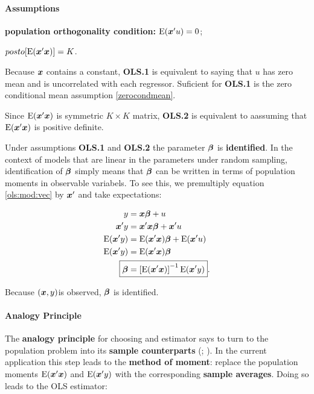 \documentclass[11pt, oneside, a4paper, article]{article}
\numberwithin{equation}{section}
\begin{document}
\paragraph{Assumptions}

\begin{description}[itemsep = 1ex]
	\item[OLS.1]  \textbf{population orthogonality condition:} $\text{E}(\boldsymbol{x}'u) = 0$;

	\item[OLS.2]  $posto[ \text{E}( \boldsymbol{x}' \boldsymbol{x} ) ] = K$.
\end{description}

Because $\boldsymbol{x}$ contains a constant, \textbf{OLS.1} is equivalent to saying that $u$ has zero mean and is uncorrelated with each regressor.
Suficient for \textbf{OLS.1} is the zero conditional mean assumption \eqref{zerocondmean}.

Since $\text{E}( \boldsymbol{x}'\boldsymbol{x} )$ is symmetric $K \times K$ matrix, \textbf{OLS.2} is equivalent to aassuming that $\text{E}( \boldsymbol{x}'\boldsymbol{x} )$ is positive definite.

Under assumptions \textbf{OLS.1} and \textbf{OLS.2} the parameter $\boldsymbol{\beta}$ is \textbf{identified}.
In the context of models that are linear in the parameters under random sampling, identification of $\boldsymbol{\beta}$ simply means that $\boldsymbol{\beta}$ can be written in terms of population moments in observable variabels.
To see this, we premultiply equation \eqref{ols:mod:vec} by $\boldsymbol{x}'$ and take expectations:

\vspace{-1 em}
\begin{align*}
	y &= \xvec \betavec + u
	\\
	\xvec' y &= \xvec' \xvec \betavec + \xvec' u
	\\
	\E( \xvec' y) &= \E( \xvec' \xvec) \betavec + \E(\xvec' u)
	\\
	\E( \xvec' y) &= \E( \xvec' \xvec) \betavec
	\\
	\Aboxed{\betavec &= \left[ \E( \xvec' \xvec) \right]^{-1} \E( \xvec' y) }.
\end{align*}

Because $(\boldsymbol{x}, y)$is observed, $\boldsymbol{\beta}$ is identified.

\paragraph{Analogy Principle}
The \textbf{analogy principle} for choosing and estimator says to turn to the population problem into its \textbf{sample counterparts} (; ).
In the current application this step leads to the \textbf{method of moment}:
replace the population moments $\text{E}( \boldsymbol{x}' \boldsymbol{x})$ and $\text{E}(\boldsymbol{x}' y)$ with the corresponding \textbf{sample averages}.
Doing so leads to the OLS estimator:
\end{document}
